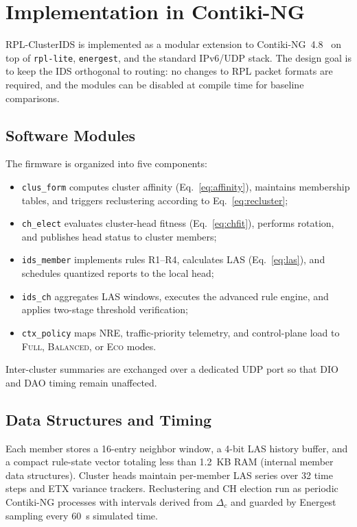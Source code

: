 \section{Implementation in Contiki-NG}
\label{sec:impl}

RPL-ClusterIDS is implemented as a modular extension to Contiki-NG~4.8~\cite{oikonomou2022contik} on top of \texttt{rpl-lite}, \texttt{energest}, and the standard IPv6/UDP stack.
The design goal is to keep the IDS orthogonal to routing: no changes to RPL packet formats are required, and the modules can be disabled at compile time for baseline comparisons.

\subsection{Software Modules}
The firmware is organized into five components:
\begin{itemize}
  \item \texttt{clus\_form} computes cluster affinity (Eq.~\ref{eq:affinity}), maintains membership tables, and triggers reclustering according to Eq.~\ref{eq:recluster};
  \item \texttt{ch\_elect} evaluates cluster-head fitness (Eq.~\ref{eq:chfit}), performs rotation, and publishes head status to cluster members;
  \item \texttt{ids\_member} implements rules R1--R4, calculates LAS (Eq.~\ref{eq:las}), and schedules quantized reports to the local head;
  \item \texttt{ids\_ch} aggregates LAS windows, executes the advanced rule engine, and applies two-stage threshold verification;
  \item \texttt{ctx\_policy} maps NRE, traffic-priority telemetry, and control-plane load to \textsc{Full}, \textsc{Balanced}, or \textsc{Eco} modes.
\end{itemize}
Inter-cluster summaries are exchanged over a dedicated UDP port so that DIO and DAO timing remain unaffected.

\subsection{Data Structures and Timing}
Each member stores a 16-entry neighbor window, a 4-bit LAS history buffer, and a compact rule-state vector totaling less than 1.2~KB RAM (internal member data structures).
Cluster heads maintain per-member LAS series over 32 time steps and ETX variance trackers.
Reclustering and CH election run as periodic Contiki-NG processes with intervals derived from $\Delta_c$ and guarded by Energest sampling every 60~s simulated time.

